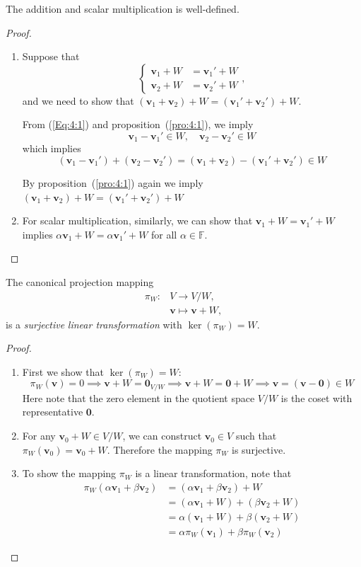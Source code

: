 \begin{proposition}
The addition and scalar multiplication is well-defined.
\end{proposition}
\begin{proof}
\begin{enumerate}
\item
Suppose that
\begin{equation}\label{Eq:4:1}
\left\{
\begin{aligned}
\bm v_1+W&=\bm v_1'+W\\
\bm v_2+W&=\bm v_2'+W
\end{aligned}
\right.,
\end{equation}
and we need to show that $(\bm v_1+\bm v_2)+W=(\bm v_1'+\bm v_2')+W$. 

From (\ref{Eq:4:1}) and proposition~(\ref{pro:4:1}), we imply
\[
\bm v_1-\bm v_1'\in W,\quad
\bm v_2-\bm v_2'\in W
\]
which implies
\[
(\bm v_1-\bm v_1')+(\bm v_2-\bm v_2')=(\bm v_1+\bm v_2) - (\bm v_1'+\bm v_2')\in W
\]

By proposition~(\ref{pro:4:1}) again we imply $(\bm v_1+\bm v_2)+W=(\bm v_1'+\bm v_2')+W$
\item
For scalar multiplication, similarly, we can show that $\bm v_1+W=\bm v_1'+W$ implies $\alpha\bm v_1+W=\alpha\bm v_1'+W$ for all $\alpha\in\mathbb{F}$.

\end{enumerate}

\end{proof}

\begin{proposition}
The canonical projection mapping
\[
\begin{aligned}
\pi_W:&V\to V/ W,\\
&\bm v\mapsto\bm v+W,
\end{aligned}
\]
is a \emph{surjective} \emph{linear transformation} with $\ker(\pi_W) = W$.
\end{proposition}
\begin{proof}
\begin{enumerate}
\item
First we show that $\ker(\pi_W)=W$:
\[
\pi_W(\bm v)=0\implies
\bm v+W=\bm0_{V/ W}\implies
\bm v+W=\bm0+W\implies \bm v=(\bm v-\bm0)\in W
\]
Here note that the zero element in the quotient space $V/ W$ is the coset with representative $\bm0$.
\item
For any $\bm v_0+W\in V/ W$, we can construct $\bm v_0\in V$ such that $\pi_W(\bm v_0)=\bm v_0+W$. Therefore the mapping $\pi_W$ is surjective.
\item
To show the mapping $\pi_W$ is a linear transformation, note that
\begin{align*}
\pi_W(\alpha\bm v_1+\beta\bm v_2)&=(\alpha\bm v_1+\beta\bm v_2)+W\\
&=(\alpha\bm v_1+W)+(\beta\bm v_2+W)\\
&=\alpha(\bm v_1+W)+\beta(\bm v_2+W)\\
&=\alpha\pi_W(\bm v_1)+\beta\pi_W(\bm v_2)
\end{align*}

\end{enumerate}


\end{proof}



